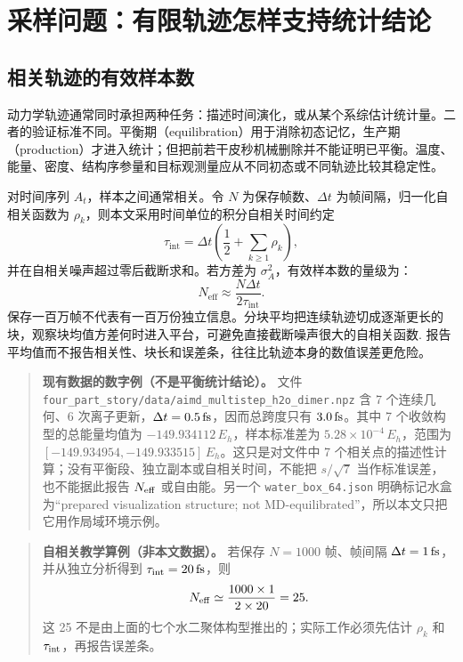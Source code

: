 \documentclass[UTF8,10pt,a4paper,fontset=none]{ctexart}
\begin{document}
\section{采样问题：有限轨迹怎样支持统计结论}

\subsection{相关轨迹的有效样本数}

动力学轨迹通常同时承担两种任务：描述时间演化，或从某个系综估计统计量。二者的验证标准不同。平衡期（equilibration）用于消除初态记忆，生产期（production）才进入统计；但把前若干皮秒机械删除并不能证明已平衡。温度、能量、密度、结构序参量和目标观测量应从不同初态或不同轨迹比较其稳定性。

对时间序列 $A_t$，样本之间通常相关。令 $N$ 为保存帧数、$\Delta t$ 为帧间隔，归一化自相关函数为 $\rho_k$，则本文采用时间单位的积分自相关时间约定
\begin{equation}
  \tau_{\mathrm{int}}=\Delta t\left(\frac12+\sum_{k\ge1}\rho_k\right),
\end{equation}
并在自相关噪声超过零后截断求和。若方差为 $\sigma_A^2$，有效样本数的量级为：
\begin{equation}
  N_{\mathrm{eff}}\approx\frac{N\Delta t}{2\tau_{\mathrm{int}}}.
\end{equation}
保存一百万帧不代表有一百万份独立信息。分块平均把连续轨迹切成逐渐更长的块，观察块均值方差何时进入平台，可避免直接截断噪声很大的自相关函数\cite{flyvbjerg1989}. 报告平均值而不报告相关性、块长和误差条，往往比轨迹本身的数值误差更危险。

\begin{quote}\small
\textbf{现有数据的数字例（不是平衡统计结论）。} 文件 \texttt{four\_part\_story/data/aimd\_multistep\_h2o\_dimer.npz} 含 7 个连续几何、6 次离子更新，\(\Delta t=0.5\,{\rm fs}\)，因而总跨度只有 \(3.0\,{\rm fs}\)。其中 7 个收敛构型的总能量均值为 \(-149.934112\,E_h\)，样本标准差为 \(5.28\times10^{-4}\,E_h\)，范围为 \([-149.934954,-149.933515]\,E_h\)。这只是对文件中 7 个相关点的描述性计算；没有平衡段、独立副本或自相关时间，不能把 \(s/\sqrt{7}\) 当作标准误差，也不能据此报告 \(N_{\rm eff}\) 或自由能。另一个 \texttt{water\_box\_64.json} 明确标记水盒为“prepared visualization structure; not MD-equilibrated”，所以本文只把它用作局域环境示例。
\end{quote}

\begin{quote}\small
\textbf{自相关教学算例（非本文数据）。} 若保存 \(N=1000\) 帧、帧间隔 \(\Delta t=1\,{\rm fs}\)，并从独立分析得到 \(\tau_{\rm int}=20\,{\rm fs}\)，则
\[
N_{\rm eff}\simeq\frac{1000\times1}{2\times20}=25.
\]
这 25 不是由上面的七个水二聚体构型推出的；实际工作必须先估计 \(\rho_k\) 和 \(\tau_{\rm int}\)，再报告误差条。
\end{quote}
\end{document}
